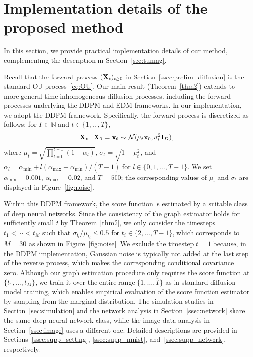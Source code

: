 \documentclass[11pt,a4paper,final]{article}
\numberwithin{equation}{section}
\theoremstyle{remark}
\def\cN{\mathcal N}
\newcommand{\bI}{{\bf I}}
\newcommand{\bx}{{\bf x}}
\newcommand{\bX}{{\bf X}}
\newcommand{\bbN}{{\mathbb N}}
\newcommand{\bean}{\setlength\arraycolsep{1pt}\begin{eqnarray*}}
\newcommand{\eean}{\end{eqnarray*}}
\begin{document}
\section{Implementation details of the proposed method}
 \label{sec:supp_details}

In this section, we provide practical implementation details of our method, complementing the description in Section~\ref{sec:tuning}.

Recall that the forward process $(\bX_t)_{t \geq 0}$ in Section~\ref{ssec:prelim_diffusion} is the standard OU process~\eqref{eq:OU}.
Our main result (Theorem~\ref{thm2}) extends to more general time-inhomogeneous diffusion processes, including the forward processes underlying the DDPM \citep{ho2020denoising, song2021scorebased} and EDM \citep{karras2022elucidating} frameworks.
In our implementation, we adopt the DDPM framework.
Specifically, the forward process is discretized as follows: for $\overline{T} \in \bbN$ and $t \in \{1, \ldots, \overline{T}\}$,
\bean
\bX_{t} \mid \bX_{0} = \bx_{0} \sim \cN(\mu_{t} \bx_{0}, \sigma_{t}^{2} \bI_{D}),
\eean
where $\mu_{t} = \sqrt{\prod_{l=0}^{t-1} (1 - \alpha_{l})}$, $\sigma_{t} = \sqrt{1 - \mu_{t}^{2}}$, and $\alpha_{l} = \alpha_{\min} + l(\alpha_{\max} - \alpha_{\min}) / (\overline{T} - 1)$ for $l \in \{0, 1, \ldots, \overline{T}-1 \}$.
We set $\alpha_{\min} = 0.001$, $\alpha_{\max} = 0.02$, and $\overline{T} = 500$; the corresponding values of $\mu_{t}$ and $\sigma_{t}$ are displayed in Figure~\ref{fig:noise}.

Within this DDPM framework, the score function is estimated by a suitable class of deep neural networks.
Since the consistency of the graph estimator holds for sufficiently small $t$ by Theorem~\ref{thm2}, we only consider the timesteps $t_{1} < \cdots < t_{M}$ such that $\sigma_{t_{i}} / \mu_{t_{i}} \leq 0.5$ for $t_{i} \in \{2, \ldots, \overline{T}-1\}$, which corresponds to $M = 30$ as shown in Figure~\ref{fig:noise}.
We exclude the timestep $t = 1$ because, in the DDPM implementation, Gaussian noise is typically not added at the last step of the reverse process, which makes the corresponding conditional covariance zero.
Although our graph estimation procedure only requires the score function at $\{t_{1}, \ldots, t_{M}\}$, we train it over the entire range $\{1, \ldots, \overline{T}\}$ as in standard diffusion model training, which enables empirical evaluation of the score function estimator by sampling from the marginal distribution.
The simulation studies in Section~\ref{sec:simulation} and the network analysis in Section~\ref{ssec:network} share the same deep neural network class, while the image data analysis in Section~\ref{ssec:image} uses a different one.
Detailed descriptions are provided in Sections~\ref{ssec:supp_setting}, \ref{ssec:supp_mnist}, and~\ref{ssec:supp_network}, respectively.
\end{document}
